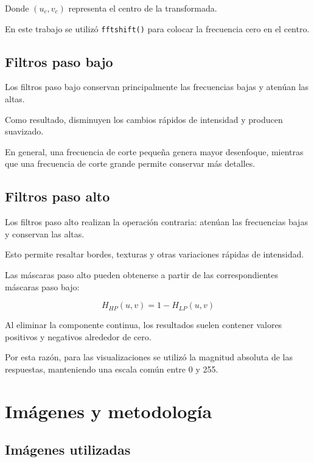 \documentclass[11pt,letterpaper]{article}
\begin{document}
Donde $(u_c,v_c)$ representa el centro
de la transformada.

En este trabajo se utilizó
\texttt{fftshift()} para colocar la
frecuencia cero en el centro.

\subsection{Filtros paso bajo}

Los filtros paso bajo conservan principalmente
las frecuencias bajas y atenúan las altas.

Como resultado, disminuyen los cambios rápidos
de intensidad y producen suavizado.

En general, una frecuencia de corte pequeña
genera mayor desenfoque, mientras que una
frecuencia de corte grande permite conservar
más detalles.

\subsection{Filtros paso alto}

Los filtros paso alto realizan la operación
contraria: atenúan las frecuencias bajas
y conservan las altas.

Esto permite resaltar bordes, texturas
y otras variaciones rápidas de intensidad.

Las máscaras paso alto pueden obtenerse
a partir de las correspondientes máscaras
paso bajo:

\begin{equation}
H_{HP}(u,v)=1-H_{LP}(u,v)
\label{eq:complemento}
\end{equation}

Al eliminar la componente continua,
los resultados suelen contener valores
positivos y negativos alrededor de cero.

Por esta razón, para las visualizaciones
se utilizó la magnitud absoluta de las
respuestas, manteniendo una escala
común entre 0 y 255.

\section{Imágenes y metodología}

\subsection{Imágenes utilizadas}
\end{document}

